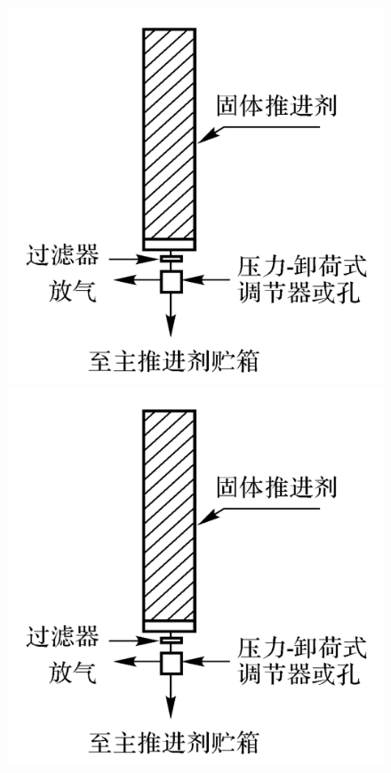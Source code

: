 \begin{enumerate}[\hspace*{1.5em} (1) ]
\begin{enumerate}
	\begin{figure}[!htb]
		\begin{minipage}{0.25\linewidth}
			\centering
			\includegraphics[width=\linewidth]{pic/固体1.png}
		\end{minipage}
		\begin{minipage}{0.25\linewidth}
			\centering
			\includegraphics[width=\linewidth]{pic/固体1.png}

\end{minipage}
\end{figure}
\end{enumerate}
\end{enumerate}
